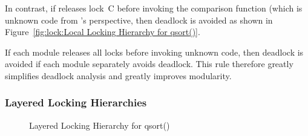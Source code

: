 In contrast, if  releases lock~C before invoking the
comparison function (which is unknown code from 's perspective,
then deadlock is avoided as shown in
Figure~\ref{fig:lock:Local Locking Hierarchy for qsort()}.

If each module releases all locks before invoking unknown code, then
deadlock is avoided if each module separately avoids deadlock.
This rule therefore greatly simplifies deadlock analysis and greatly
improves modularity.

\subsubsection{Layered Locking Hierarchies}
\label{sec:locking:Layered Locking Hierarchies}

\begin{figure}[tb]
\begin{center}
\end{center}
\caption{Layered Locking Hierarchy for qsort()}
\label{fig:lock:Layered Locking Hierarchy for qsort()}
\end{figure}

